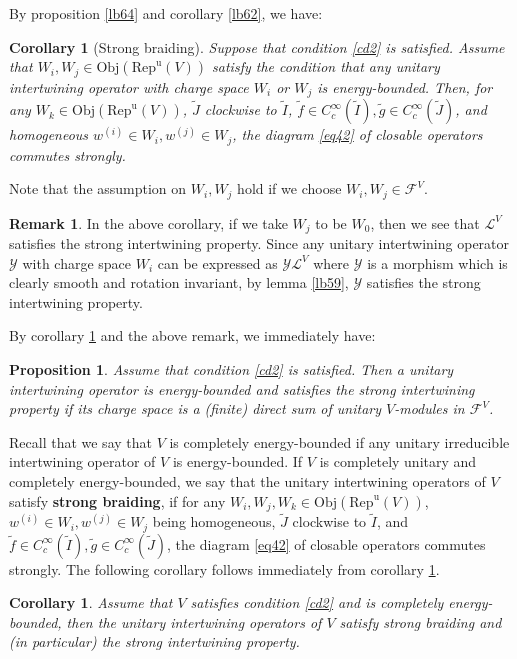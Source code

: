 \documentclass[11pt,b5paper,notitlepage]{article}
\theoremstyle{definition}
\newtheorem{rem}[df]{Remark}
\theoremstyle{plain}
\newtheorem{pp}[df]{Proposition}
\newtheorem{co}[df]{Corollary}
\newcommand{\mc}{\mathcal}
\newcommand{\wtd}{\widetilde}
\newcommand{\RepuV}{\mathrm{Rep}^{\mathrm u}(V)}
\newcommand{\Obj}{\mathrm{Obj}}
\numberwithin{equation}{subsection}
\begin{document}
By proposition \ref{lb64} and corollary \ref{lb62}, we have:

\begin{co}[Strong braiding]\label{lb65}
Suppose that condition \ref{cd2} is satisfied. Assume that  $W_i,W_j\in\Obj(\RepuV)$ satisfy the condition that any  unitary intertwining operator with charge space $W_i$ or $W_j$ is energy-bounded.  Then, for any $W_k\in\Obj(\RepuV)$, $\wtd J$ clockwise to $\wtd I$, $\wtd f\in C_c^\infty(\wtd I),\wtd g\in C_c^\infty(\wtd J)$, and homogeneous $w^{(i)}\in W_i,w^{(j)}\in W_j$, the diagram \eqref{eq42} of closable operators commutes strongly.
\end{co}

Note that the assumption on $W_i,W_j$ hold if we choose $W_i,W_j\in\mc F^V$.

\begin{rem}\label{lb72}
In the above corollary, if we take $W_j$ to be $W_0$, then we see that $\mc L^V$ satisfies the strong intertwining property. Since any unitary intertwining operator $\mc Y$ with charge space $W_i$ can be expressed as $\mc Y\mc L^V$ where $\mc Y$ is a morphism which is clearly smooth and rotation invariant, by lemma \ref{lb59}, $\mc Y$ satisfies the strong intertwining property. 
\end{rem}

By corollary \ref{lb65} and the above remark, we immediately have:

\begin{pp}\label{lb88}
Assume that condition \ref{cd2} is satisfied. Then  a unitary intertwining operator is energy-bounded and satisfies the strong intertwining property if its charge space is a (finite) direct sum of unitary $V$-modules in $\mc F^V$.
\end{pp}



Recall that we say that $V$ is completely energy-bounded if any  unitary irreducible intertwining operator of $V$ is energy-bounded. If $V$ is completely unitary and completely energy-bounded, we say that the unitary intertwining operators of $V$ satisfy \textbf{strong braiding}, if for any $W_i,W_j,W_k\in\Obj(\RepuV)$, $w^{(i)}\in W_i,w^{(j)}\in W_j$ being homogeneous, $\wtd J$ clockwise to $\wtd I$, and $\wtd f\in C_c^\infty(\wtd I),\wtd g\in C_c^\infty(\wtd J)$, the diagram \eqref{eq42} of closable operators commutes strongly. The following corollary follows immediately from corollary \ref{lb65}.

\begin{co}\label{lb80}
Assume that $V$ satisfies condition \ref{cd2} and is completely energy-bounded, then the unitary intertwining operators of $V$ satisfy strong braiding and (in particular) the strong intertwining property.
\end{co}
\end{document}
